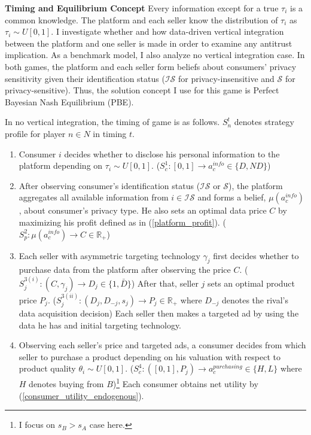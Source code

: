 \documentclass[12pt]{article}
\begin{document}
 
\textbf{Timing and Equilibrium Concept} \quad Every information except for a true $\tau_i$ is a common knowledge. The platform and each seller know the distribution of $\tau_i$ as $\tau_i \sim U[0, 1]$. I investigate whether and how data-driven vertical integration between the platform and one seller is made in order to examine any antitrust implication. As a benchmark model, I also analyze no vertical integration case. In both games, the platform and each seller form beliefs about consumers' privacy sensitivity given their identification status ($\mathcal{IS}$ for privacy-insensitive and $\mathcal{S}$ for privacy-sensitive). Thus, the solution concept I use for this game is Perfect Bayesian Nash Equilibrium (PBE). 
 
In no vertical integration, the timing of game is as follows. $S_n^t$ denotes strategy profile for player $n \in N$ in timing $t$. 
\begin{enumerate}
	\item Consumer $i$ decides whether to disclose his personal information to the platform depending on $\tau_i \sim U[0,1]$. ($S_c^1: [0,1] \rightarrow a_c^{info} \in \{D, ND\}$) 
	\item  After observing consumer's identification status ($\mathcal{IS}$ or $\mathcal{S}$), the platform aggregates all available information from $i \in \mathcal{IS}$ and forms a belief, $\mu(a_c^{info})$, about consumer's privacy type. He also sets an optimal data price $C$ by maximizing his profit defined as in (\ref{platform_profit}). ($S_p^2: \mu(a_c^{info}) \rightarrow C \in \mathbb{R}_+$)
	\item Each seller with asymmetric targeting technology $\gamma_j$ first decides whether to purchase data from the platform after observing the price $C$. ($S_j^{3(i)}:(C, \gamma_j)\rightarrow D_j \in \{1, \bar{D}\}$) After that, seller $j$ sets an optimal product price $P_j$. ($S_j^{3(ii)}:(D_j,D_{-j},s_j) \rightarrow P_j \in \mathbb{R}_+$ where $D_{-j}$ denotes the rival's data acquisition decision) Each seller then makes a targeted ad by using the data he has and initial targeting technology.
	\item  Observing each seller's price and targeted ads, a consumer decides from which seller to purchase a product depending on his valuation with respect to product quality $\theta_i \sim U[0,1]$. ($S_c^4: ([0,1], P_j) \rightarrow a_c^{purchasing} \in \{H, L\}$ where $H$ denotes buying from $B$)\footnote{I focus on $s_B>s_A$ case here.} Each consumer obtains net utility by (\ref{consumer_utility_endogenous}). 
\end{enumerate}
\end{document}
